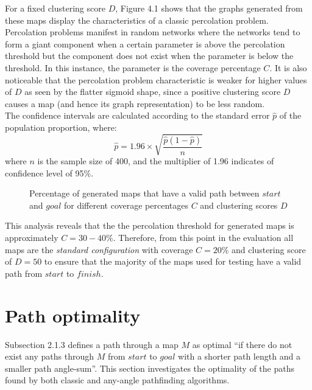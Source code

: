 \documentclass[12pt,notitlepage]{report}
\begin{document}
\noindent
For a fixed clustering score $D$, Figure 4.1 shows that the graphs generated from these maps display the characteristics of a classic percolation problem\cite{Grimmett99}. Percolation problems manifest in random networks where the networks tend to form a giant component when a certain parameter is above the percolation threshold but the component does not exist when the parameter is below the threshold. In this instance, the parameter is the coverage percentage $C$. It is also noticeable that the percolation problem characteristic is weaker for higher values of $D$ as seen by the flatter sigmoid shape, since a positive clustering score $D$ causes a map (and hence its graph representation) to be less random.\\

\noindent
The confidence intervals are calculated according to the standard error $\hat{p}$ of the population proportion\cite{PennState}, where:
\begin{equation}
\hat{p} = 1.96 \times \sqrt{\frac{\hat{p}(1-\hat{p})}{n}}
\end{equation}
where $n$ is the sample size of 400, and the multiplier of 1.96 indicates of confidence level of 95\%.\\

\begin{figure}
\centering

\caption[Percentage of generated maps that have a valid path between $start$ and $goal$]{Percentage of generated maps that have a valid path between $start$ and $goal$ for different coverage percentages $C$ and clustering scores $D$}
\end{figure}

\noindent
This analysis reveals that the the percolation threshold for generated maps is approximately $C=30-40\%$. Therefore, from this point in the evaluation all maps are the {\em standard configuration} with coverage $C=20\%$ and clustering score of $D=50$ to ensure that the majority of the maps used for testing have a valid path from $start$ to $finish$.

\section{Path optimality}

Subsection 2.1.3 defines a path through a map $M$ as optimal ``if there do not exist any paths through $M$ from $start$ to $goal$ with a shorter path length and a smaller path angle-sum''. This section investigates the optimality of the paths found by both classic and any-angle pathfinding algorithms.\\
\end{document}
